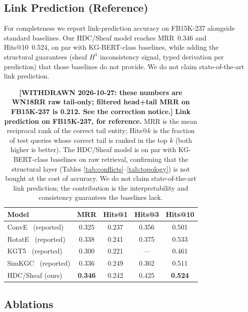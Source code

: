\subsection{Link Prediction (Reference)}

For completeness we report link-prediction accuracy on FB15K-237 alongside standard baselines.
Our HDC/Sheaf model reaches MRR~0.346 and Hits@10~0.524, on par with KG-BERT-class baselines, while adding the structural guarantees (sheaf $H^1$ inconsistency signal, typed derivation per prediction) that those baselines do not provide.
We do not claim state-of-the-art link prediction.

\begin{table}[t]
\centering
\caption{\textbf{\textcolor{red!70!black}{[WITHDRAWN 2026-10-27: these numbers are WN18RR raw tail-only; filtered head+tail MRR on FB15K-237 is 0.212. See the correction notice.]}} \textbf{Link prediction on FB15K-237, for reference.} MRR is the
mean reciprocal rank of the correct tail entity; Hits@$k$ is the fraction
of test queries whose correct tail is ranked in the top $k$ (both higher
is better). The HDC/Sheaf model is on par with KG-BERT-class baselines on
raw retrieval, confirming that the structural layer (Tables
\ref{tab:conflicts}--\ref{tab:topology}) is not bought at the cost of
accuracy. We do not claim state-of-the-art link prediction; the
contribution is the interpretability and consistency guarantees the
baselines lack.}
\label{tab:link_prediction}
\begin{tabular}{lcccc}
\toprule
Model & MRR & Hits@1 & Hits@3 & Hits@10 \\
\midrule
ConvE~\cite{conve2018} (reported) & 0.325 & 0.237 & 0.356 & 0.501 \\
RotatE~\cite{rotate2019} (reported) & 0.338 & 0.241 & 0.375 & 0.533 \\
KGT5~\cite{saxena2022sequence} (reported) & 0.300 & 0.221 & --- & 0.461 \\
SimKGC~\cite{wang2022simkgc} (reported) & 0.336 & 0.249 & 0.362 & 0.511 \\
HDC/Sheaf (ours) & \textbf{0.346} & 0.242 & 0.425 & \textbf{0.524} \\
\bottomrule
\end{tabular}
\end{table}

\subsection{Ablations}

